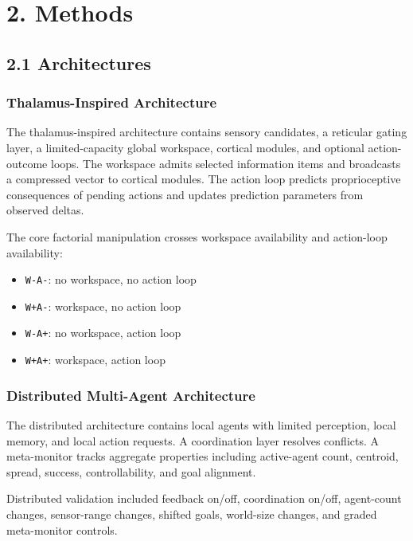 \documentclass[
  11pt,
  letterpaper,
]{article}
\providecommand{\tightlist}{%
  \setlength{\itemsep}{0pt}\setlength{\parskip}{0pt}}
\begin{document}
\section{2. Methods}\label{methods}

\subsection{2.1 Architectures}\label{architectures}

\subsubsection{Thalamus-Inspired
Architecture}\label{thalamus-inspired-architecture}

The thalamus-inspired architecture contains sensory candidates, a
reticular gating layer, a limited-capacity global workspace, cortical
modules, and optional action-outcome loops. The workspace admits
selected information items and broadcasts a compressed vector to
cortical modules. The action loop predicts proprioceptive consequences
of pending actions and updates prediction parameters from observed
deltas.

The core factorial manipulation crosses workspace availability and
action-loop availability:

\begin{itemize}
\tightlist
\item
  \texttt{W-A-}: no workspace, no action loop
\item
  \texttt{W+A-}: workspace, no action loop
\item
  \texttt{W-A+}: no workspace, action loop
\item
  \texttt{W+A+}: workspace, action loop
\end{itemize}

\subsubsection{Distributed Multi-Agent
Architecture}\label{distributed-multi-agent-architecture}

The distributed architecture contains local agents with limited
perception, local memory, and local action requests. A coordination
layer resolves conflicts. A meta-monitor tracks aggregate properties
including active-agent count, centroid, spread, success,
controllability, and goal alignment.

Distributed validation included feedback on/off, coordination on/off,
agent-count changes, sensor-range changes, shifted goals, world-size
changes, and graded meta-monitor controls.
\end{document}
